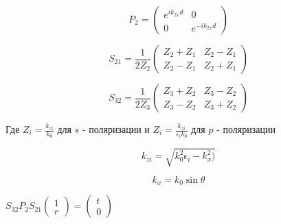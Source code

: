 $$P_{2}=\left(\begin{array}{cc}
e^{i k_{2 x} d} & 0 \\
0 & e^{-i k_{2 x} d}
\end{array}\right)$$



$$
S_{21} = 
\frac{1}{2 Z_2}\begin{pmatrix}
	Z_2+Z_1 & Z_2 -Z_1 \\
	Z_2-Z_1 & Z_2+Z_1
\end{pmatrix}
$$


$$
S_{32} = 
\frac{1}{2 Z_3}\begin{pmatrix}
Z_3+Z_2 & Z_3 -Z_2 \\
Z_3-Z_2 & Z_3+Z_2
\end{pmatrix}
$$

Где $Z_i = \frac{k_{zi}}{k_0}$ для $ s $ - поляризации и $Z_i = \frac{k_{zi}}{\varepsilon_i k_0}$ для $ p $ - поляризации 

$$
 k_{zi} = \sqrt{k_0^2 \epsilon_i - k_x^2)}
$$

$$
 k_{x} = k_0 \sin{ \theta}
$$


$
S_{32} P_2 S_{21} \begin{pmatrix}
	1\\
	r 
\end{pmatrix} = 
\begin{pmatrix}
t\\
0 
\end{pmatrix}
$





